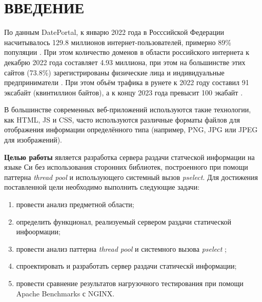 \section*{\large ВВЕДЕНИЕ}

По данным DatePortal, к январю 2022 года в Росссийской Федерации насчитывалось 129.8 миллионов интернет-пользователей, примерно 89\% популяции \cite{digital-2022}. При этом количество доменов в области российского интернета к декабрю 2022 года составляет 4.93 миллиона, при этом на большинстве этих сайтов (73.8\%) зарегистрированы физические лица и индивидуальные предприниматели \cite{forbes-ru}.  При этом объём трафика в рунете к 2022 году составил 91 эксабайт (квинтиллион байтов), а к концу 2023 года превысит 100 экабайт \cite{telecom-daily}.

В большинстве современных веб-приложений используются такие технологии, как HTML, JS и CSS, часто используются различные форматы файлов для отображения информации определённого типа (например, PNG, JPG или JPEG для изображений).

\textbf{Целью работы} является разработка сервера раздачи статческой информации на языке Си без использования сторонних библиотек, построенного при помощи паттерна \textit{thread pool} и использующего системный вызов \textit{pselect}. 
Для достижения поставленной цели необходимо выполнить следующие задачи:
\begin{enumerate}[label=\arabic*)]
	\item провести анализ предметной области;
	\item определить функционал, реализуемый сервером раздачи статической инфоормации;
	\item провести анализ паттерна \textit{thread pool} и системного вызова \textit{pselect} ;
	\item спроектировать и разработать сервер раздачи статическй информации;
	\item провести сравнение результатов нагрузочного тестирования при помощи Apache Benchmarks с NGINX.
\end{enumerate}

